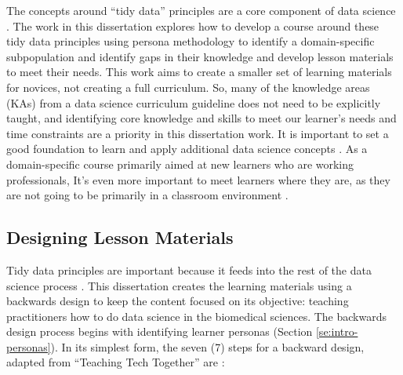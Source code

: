 \documentclass[010-intro.tex]{subfiles}
\begin{document}
    The concepts around ``tidy data'' principles are a core component of data science
    \cite{ccdsc2021, wickhamTidyData2014}.
    The work in this dissertation explores how to develop a course around these tidy data principles
    using persona methodology to identify a domain-specific subpopulation and identify gaps in their knowledge
    and develop lesson materials to meet their needs.
    This work aims to create a smaller set of learning materials for novices, not creating a full curriculum.
    So, many of the knowledge areas (KAs) from a data science curriculum guideline does not need to be explicitly taught,
    and identifying core knowledge and skills to meet our learner's needs and time constraints are a priority
    in this dissertation work.
    It is important to set a good foundation to learn and apply additional data science concepts
    \cite{cc2005, cc2020, gaise2016, ambrose2010learning, wilson2019teaching, hermansProgrammerBrain2021}.
    As a domain-specific course primarily aimed at new learners who are working professionals,
    It's even more important to meet learners where they are, as they are not going to be primarily in a classroom environment
    \cite{wilson2019teaching, Koch2016, thecarpentriesCarpentryTrainerTraining}.

    \subsection{Designing Lesson Materials}

        Tidy data principles are important because it feeds into the rest of the data science process
        \cite{wickhamTidyData2014, ccdsc2021, wickhamR4ds}.
        This dissertation creates the learning materials using a backwards design to keep the content focused
        on its objective: teaching practitioners how to do data science in the biomedical sciences.
        The backwards design process begins with identifying learner personas (Section \ref{se:intro-personas}).
        In its simplest form, the seven (7) steps for a backward design, adapted from ``Teaching Tech Together'' are
        \cite{wilson2019teaching}:
\end{document}
